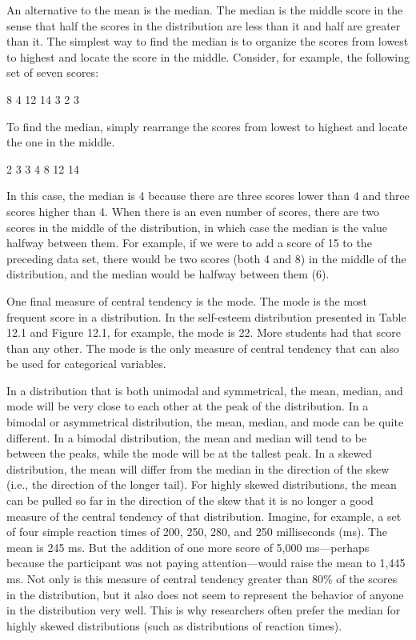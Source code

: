 An alternative to the mean is the median. The median is the middle score in the sense that half the scores in the distribution are less than it and half are greater than it. The simplest way to find the median is to organize the scores from lowest to highest and locate the score in the middle. Consider, for example, the following set of seven scores:


\begin{kframe}
8 4 12 14 3 2 3

\end{kframe}

To find the median, simply rearrange the scores from lowest to highest and locate the one in the middle.


\begin{kframe}
2 3 3 4 8 12 14

\end{kframe}

In this case, the median is 4 because there are three scores lower than 4 and three scores higher than 4. When
there is an even number of scores, there are two scores in the middle of the distribution, in which case the median is the value halfway between them. For example, if we were to add a score of 15 to the preceding data set, there would be two scores (both 4 and 8) in the middle of the distribution, and the median would be halfway between them (6).


One final measure of central tendency is the mode. The mode is the most frequent score in a distribution. In the self-esteem distribution presented in Table 12.1 and Figure 12.1, for example, the mode is 22. More students had that score than any other. The mode is the only measure of central tendency that can also be used for categorical variables.


In a distribution that is both unimodal and symmetrical, the mean, median, and mode will be very close to each other at the peak of the distribution. In a bimodal or asymmetrical distribution, the mean, median, and mode can be quite different. In a bimodal distribution, the mean and median will tend to be between the peaks, while the mode will be at the tallest peak. In a skewed distribution, the mean will differ from the median in the direction of the skew (i.e., the direction of the longer tail). For highly skewed distributions, the mean can be pulled so far in the direction of the skew that it is no longer a good measure of the central tendency of that distribution. Imagine, for example, a set of four simple reaction times of 200, 250, 280, and 250 milliseconds (ms). The mean is 245 ms. But the addition of one more score of 5,000 ms---perhaps because the participant was not paying attention---would raise the mean to 1,445 ms. Not only is this measure of central tendency greater than 80\% of the scores in the distribution, but it also does not seem to represent the behavior of anyone in the distribution very well. This is why researchers often prefer the median for highly skewed distributions (such as distributions of reaction times).


